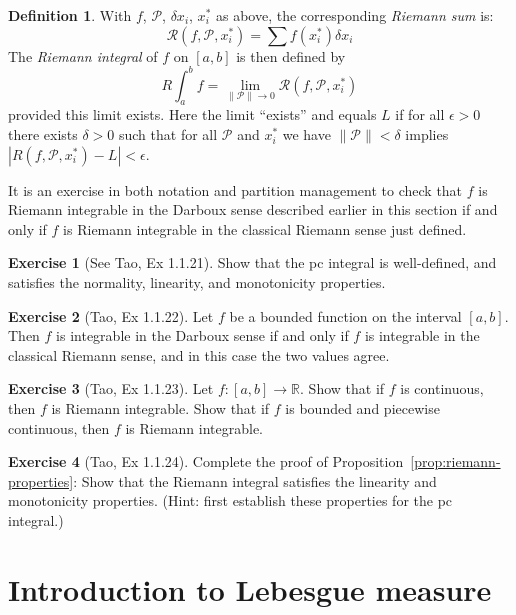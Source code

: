 \documentclass[11pt,oneside]{amsbook}
\newcommand{\RR}{{\mathbb R}}
\theoremstyle{definition}
\newtheorem{exerc}{Exercise}[section]
\theoremstyle{plain}
\theoremstyle{definition}
\newtheorem{defn}[thm]{Definition}
\theoremstyle{remark}
\numberwithin{equation}{section}
\numberwithin{figure}{section}
\begin{document}
\begin{defn}
  With $f$, $\mathcal P$, $\delta x_i$, $x_i^*$ as above, the corresponding \emph{Riemann sum} is:
  \[\mathcal R(f,\mathcal  P,x_i^*)=\sum f(x_i^*)\delta x_i
  \]
  The \emph{Riemann integral} of $f$ on $[a,b]$ is then defined by
  \[R\int_a^b f=\lim_{\|\mathcal P\|\to0}\mathcal R(f,\mathcal P,x_i^*)
  \]
  provided this limit exists. Here the limit ``exists'' and equals $L$ if for all $\epsilon>0$ there exists $\delta>0$ such that for all $\mathcal P$ and $x_i^*$ we have $\|\mathcal P\|<\delta$ implies $|R(f,\mathcal P,x_i^*)-L|<\epsilon$.
\end{defn}

It is an exercise in both notation and partition management to check that $f$ is Riemann integrable in the Darboux sense described earlier in this section if and only if $f$ is Riemann integrable in the classical Riemann sense just defined.

\begin{exerc}[See Tao, Ex 1.1.21]
  Show that the pc integral is well-defined, and satisfies the normality, linearity, and monotonicity properties.
\end{exerc}

\begin{exerc}[Tao, Ex 1.1.22]
  Let $f$ be a bounded function on the interval $[a,b]$. Then $f$ is integrable in the Darboux sense if and only if $f$ is integrable in the classical Riemann sense, and in this case the two values agree.
\end{exerc}

\begin{exerc}[Tao, Ex 1.1.23]
  Let $f\colon[a,b]\to\RR$. Show that if $f$ is continuous, then $f$ is Riemann integrable. Show that if $f$ is bounded and piecewise continuous, then $f$ is Riemann integrable.
\end{exerc}

\begin{exerc}[Tao, Ex 1.1.24]
  Complete the proof of Proposition~\ref{prop:riemann-properties}: Show that the Riemann integral satisfies the linearity and monotonicity properties. (Hint: first establish these properties for the pc integral.)
\end{exerc}

\newpage
\section{Introduction to Lebesgue measure}
\end{document}
